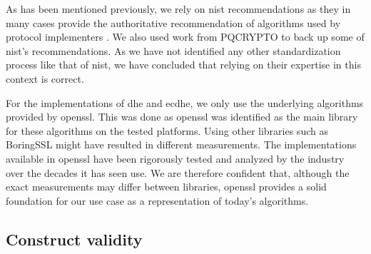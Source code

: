 As has been mentioned previously, we rely on \gls{nist} recommendations as they in many cases provide the authoritative recommendation of algorithms used by protocol implementers \cite{nist:round-three-submissions, nist2019}. We also used work from PQCRYPTO \cite{eu2015} to back up some of \gls{nist}'s recommendations. As we have not identified any other standardization process like that of \gls{nist}, we have concluded that relying on their expertise in this context is correct.

For the implementations of \gls{dhe} and \gls{ecdhe}, we only use the underlying algorithms provided by \gls{openssl}. This was done as \gls{openssl} was identified as the main library for these algorithms on the tested platforms. Using other libraries such as BoringSSL might have resulted in different measurements. The implementations available in \gls{openssl} have been rigorously tested and analyzed by the industry over the decades it has seen use. We are therefore confident that, although the exact measurements may differ between libraries, \gls{openssl} provides a solid foundation for our use case as a representation of today's algorithms.


\subsection{Construct validity}



